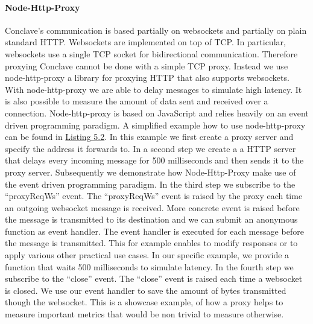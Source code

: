  \paragraph{Node-Http-Proxy}
 Conclave's communication is based partially on websockets and partially on plain standard HTTP.
 Websockets are implemented on top of TCP. In particular, websockets use a single TCP socket for bidirectional communication. Therefore proxying Conclave cannot be done with a simple TCP proxy. Instead we use node-http-proxy a library for proxying HTTP that also supports websockets. With node-http-proxy we are able to delay messages to simulate high latency. It is also possible to measure the amount of data sent and received over a connection.
 Node-http-proxy is based on JavaScript and relies heavily on an event driven programming paradigm. A simplified example how to use node-http-proxy can be found in \hyperref[the_label]{Listing 5.2}. In this example we first create a proxy server and specify the address it forwards to. In a second step we create a a HTTP server that delays every incoming message for 500 milliseconds and then sends it to the proxy server. Subsequently we demonstrate how Node-Http-Proxy make use of the event driven programming paradigm. In the third step we subscribe to the ``proxyReqWs'' event. The ``proxyReqWs'' event is raised by the proxy each time an outgoing websocket message is received. More concrete event is raised before the message is transmitted to its destination and we can submit an anonymous function as event handler. The event handler is executed for each message before the message is transmitted. This for example enables to modify responses or to apply various other practical use cases. In our specific example, we provide a function that waits 500 milliseconds to simulate latency. In the fourth step we subscribe to the ``close'' event. The ``close'' event is raised each time a websocket is closed. We use our event handler to save the amount of bytes transmitted though the websocket. This is a showcase example, of how a proxy helps to measure important metrics that would be non trivial to measure otherwise.
  \label{the_label}				
